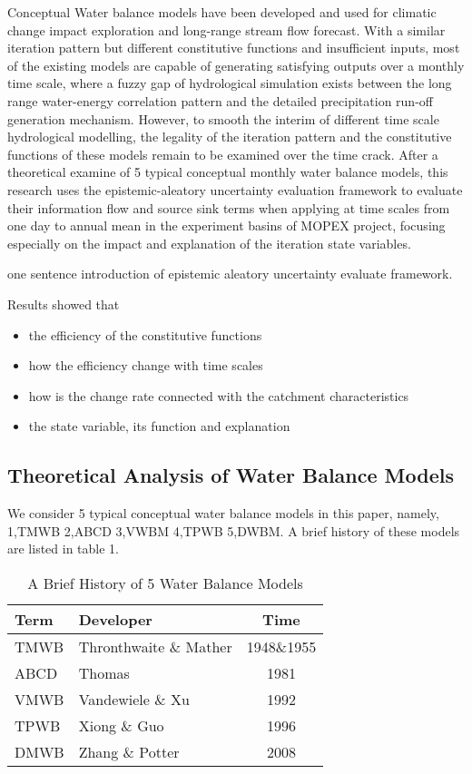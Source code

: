  
Conceptual Water balance models have been developed and used for climatic change impact exploration and long-range stream flow forecast. With a similar iteration pattern but different constitutive functions and insufficient inputs, most of the existing models are capable of generating satisfying outputs over a monthly time scale, where a fuzzy gap of hydrological simulation exists between the long range water-energy correlation pattern and the detailed precipitation run-off generation mechanism. However, to smooth the interim of different time scale hydrological modelling, the legality of the iteration pattern and the constitutive functions of these models remain to be examined over the time crack. After a theoretical examine of 5 typical conceptual monthly water balance models, this research uses the epistemic-aleatory uncertainty evaluation framework to evaluate their information flow and source sink terms when applying at time scales from one day to annual mean in the experiment basins of MOPEX project, focusing especially on the impact and explanation of the iteration state variables. 

one sentence introduction of epistemic aleatory uncertainty evaluate framework.



Results showed that
\begin{itemize}
\item the efficiency of the constitutive functions
\item how the efficiency change with time scales
\item how is the change rate connected with the catchment characteristics
\item the state variable, its function and explanation
\end{itemize} 
 

\begin{center}
\section{Theoretical Analysis of Water Balance Models} 
\end{center}


We consider 5 typical conceptual water balance models in this paper, namely, 1,TMWB 2,ABCD  3,VWBM 4,TPWB 5,DWBM. A brief history of these models are listed in table 1.
\begin{table}[H]
\caption{A Brief History of 5 Water Balance Models}
\begin{center}
\begin{tabular}{llc}
\toprule[1.5 pt]
Term  & Developer & Time  \\
\midrule[1 pt]
TMWB      & Thronthwaite \& Mather    & 1948\&1955      \\
ABCD      & Thomas     & 1981      \\
VMWB      & Vandewiele \& Xu     & 1992      \\
TPWB      & Xiong \& Guo     & 1996      \\
DMWB      & Zhang \& Potter      & 2008       \\
\bottomrule[1.5 pt]
\end{tabular}
\end{center}
\end{table}

